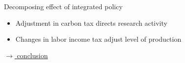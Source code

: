\documentclass[11pt,aspectratio=169]{beamer}
\begin{document}
\begin{frame}{Decomposing effect of integrated policy}
\begin{figure}
\begin{subfigure}{0.45\textwidth}
		\end{subfigure}
	\end{figure}
	\vspace{3mm}
	\begin{block}{}
		\begin{itemize}
			\item Adjustment in carbon tax directs research activity
			\item Changes in labor income tax adjust level of production %
		\end{itemize}
	\end{block}	
	
	\vspace{-5.5mm}
	\hfill
	\hyperlink{conc}{\tiny{$\rightarrow$ conclusion}}
\end{frame}

	
\end{document}
